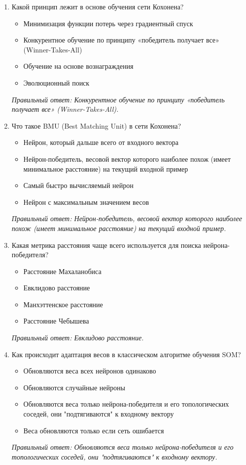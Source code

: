 \begin{enumerate}[label=\textbf{\arabic*.}, leftmargin=0pt, itemsep=1.2em]
\item Какой принцип лежит в основе обучения сети Кохонена?
\begin{itemize}[label=$\square$, leftmargin=1.5cm, itemsep=0.2em, topsep=0.3em]
\item Минимизация функции потерь через градиентный спуск
\item Конкурентное обучение по принципу «победитель получает все» (Winner-Takes-All)
\item Обучение на основе вознаграждения
\item Эволюционный поиск
\end{itemize}
{\small\textit{Правильный ответ: Конкурентное обучение по принципу «победитель получает все» (Winner-Takes-All).}}

\item Что такое BMU (Best Matching Unit) в сети Кохонена?
\begin{itemize}[label=$\square$, leftmargin=1.5cm, itemsep=0.2em, topsep=0.3em]
\item Нейрон, который дальше всего от входного вектора
\item Нейрон-победитель, весовой вектор которого наиболее похож (имеет минимальное расстояние) на текущий входной пример
\item Самый быстро вычисляемый нейрон
\item Нейрон с максимальным значением весов
\end{itemize}
{\small\textit{Правильный ответ: Нейрон-победитель, весовой вектор которого наиболее похож (имеет минимальное расстояние) на текущий входной пример.}}

\item Какая метрика расстояния чаще всего используется для поиска нейрона-победителя?
\begin{itemize}[label=$\square$, leftmargin=1.5cm, itemsep=0.2em, topsep=0.3em]
\item Расстояние Махаланобиса
\item Евклидово расстояние
\item Манхэттенское расстояние
\item Расстояние Чебышева
\end{itemize}
{\small\textit{Правильный ответ: Евклидово расстояние.}}

\item Как происходит адаптация весов в классическом алгоритме обучения SOM?
\begin{itemize}[label=$\square$, leftmargin=1.5cm, itemsep=0.2em, topsep=0.3em]
\item Обновляются веса всех нейронов одинаково
\item Обновляются случайные нейроны
\item Обновляются веса только нейрона-победителя и его топологических соседей, они "подтягиваются" к входному вектору
\item Веса обновляются только если сеть ошибается
\end{itemize}
{\small\textit{Правильный ответ: Обновляются веса только нейрона-победителя и его топологических соседей, они "подтягиваются" к входному вектору.}}


\end{enumerate}
